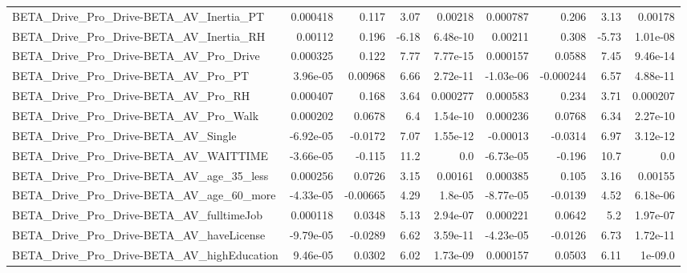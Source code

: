 \begin{tabular}{lrrrrrrrr}
BETA\_Drive\_Pro\_Drive-BETA\_AV\_Inertia\_PT            &    0.000418 &        0.117 &     3.07 &  0.00218 &   0.000787 &       0.206 &         3.13 &       0.00178 \\
BETA\_Drive\_Pro\_Drive-BETA\_AV\_Inertia\_RH            &     0.00112 &        0.196 &    -6.18 & 6.48e-10 &    0.00211 &       0.308 &        -5.73 &      1.01e-08 \\
BETA\_Drive\_Pro\_Drive-BETA\_AV\_Pro\_Drive             &    0.000325 &        0.122 &     7.77 & 7.77e-15 &   0.000157 &      0.0588 &         7.45 &      9.46e-14 \\
BETA\_Drive\_Pro\_Drive-BETA\_AV\_Pro\_PT                &    3.96e-05 &      0.00968 &     6.66 & 2.72e-11 &  -1.03e-06 &   -0.000244 &         6.57 &      4.88e-11 \\
BETA\_Drive\_Pro\_Drive-BETA\_AV\_Pro\_RH                &    0.000407 &        0.168 &     3.64 & 0.000277 &   0.000583 &       0.234 &         3.71 &      0.000207 \\
BETA\_Drive\_Pro\_Drive-BETA\_AV\_Pro\_Walk              &    0.000202 &       0.0678 &      6.4 & 1.54e-10 &   0.000236 &      0.0768 &         6.34 &      2.27e-10 \\
BETA\_Drive\_Pro\_Drive-BETA\_AV\_Single                &   -6.92e-05 &      -0.0172 &     7.07 & 1.55e-12 &   -0.00013 &     -0.0314 &         6.97 &      3.12e-12 \\
BETA\_Drive\_Pro\_Drive-BETA\_AV\_WAITTIME              &   -3.66e-05 &       -0.115 &     11.2 &      0.0 &  -6.73e-05 &      -0.196 &         10.7 &           0.0 \\
BETA\_Drive\_Pro\_Drive-BETA\_AV\_age\_35\_less           &    0.000256 &       0.0726 &     3.15 &  0.00161 &   0.000385 &       0.105 &         3.16 &       0.00155 \\
BETA\_Drive\_Pro\_Drive-BETA\_AV\_age\_60\_more           &   -4.33e-05 &     -0.00665 &     4.29 &  1.8e-05 &  -8.77e-05 &     -0.0139 &         4.52 &      6.18e-06 \\
BETA\_Drive\_Pro\_Drive-BETA\_AV\_fulltimeJob           &    0.000118 &       0.0348 &     5.13 & 2.94e-07 &   0.000221 &      0.0642 &          5.2 &      1.97e-07 \\
BETA\_Drive\_Pro\_Drive-BETA\_AV\_haveLicense           &   -9.79e-05 &      -0.0289 &     6.62 & 3.59e-11 &  -4.23e-05 &     -0.0126 &         6.73 &      1.72e-11 \\
BETA\_Drive\_Pro\_Drive-BETA\_AV\_highEducation         &    9.46e-05 &       0.0302 &     6.02 & 1.73e-09 &   0.000157 &      0.0503 &         6.11 &       1e-09.0 \\

\end{tabular}
